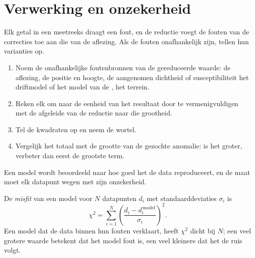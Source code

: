 \section{Verwerking en onzekerheid}\label{sec:b3:field-lab-methods-3:processing}

Elk getal in een meetreeks draagt een fout, en de reductie voegt de
fouten van de correcties toe aan die van de aflezing. Als de fouten
onafhankelijk zijn, tellen hun varianties op.

\begin{method}[Foutenbegroting]\label{met:b3:field-lab-methods-3:budget}
\begin{enumerate}
  \item Noem de onafhankelijke foutenbronnen van de gereduceerde waarde: de
        aflezing, de positie en hoogte, de aangenomen dichtheid of susceptibiliteit
        het driftmodel of het model van de , het terrein.
  \item Reken elk om naar de eenheid van het resultaat door te vermenigvuldigen met de
        afgeleide van de reductie naar die grootheid.
  \item Tel de kwadraten op en neem de wortel.
  \item Vergelijk het totaal met de grootte van de gezochte anomalie: is het
        groter, verbeter dan eerst de grootste term.
\end{enumerate}
\end{method}

Een model wordt beoordeeld naar hoe goed het de data reproduceert, en de maat
moet elk datapunt wegen met zijn onzekerheid.

\begin{definition}[Datamisfit]\label{def:b3:field-lab-methods-3:inversion-practice}
De \emph{misfit} van een model voor $N$ datapunten $d_i$ met
standaarddeviaties $\sigma_i$ is
\[
\chi^2 = \sum_{i=1}^N\left(\frac{d_i - d_i^{\,\mathrm{model}}}{\sigma_i}\right)^2 .
\]
Een model dat de data binnen hun fouten verklaart, heeft $\chi^2$ dicht bij
$N$; een veel grotere waarde betekent dat het model fout is, een veel kleinere dat
het de ruis volgt.
\end{definition}

